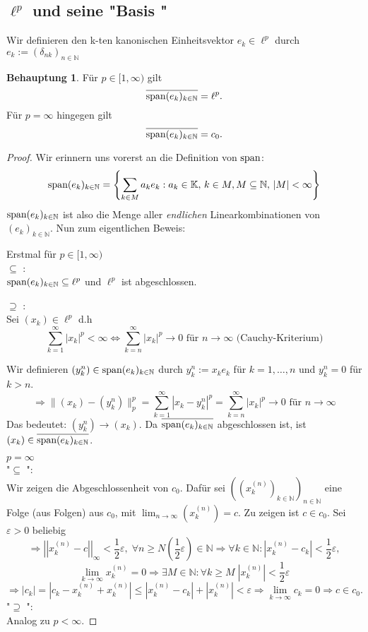 \documentclass[ngerman]{article}
\theoremstyle{definition}%
\newtheorem*{beh}{Behauptung}
\newcommand{\N}{\mathbb{N}}
\newcommand{\K}{\mathbb{K}}
\newcommand{\abs}[1]{\left\lvert #1 \right\rvert }
\newcommand{\norm}[1]{\left\lvert \left\lvert #1 \right\rvert \right\rvert}
\newcommand{\df}{\Rightarrow} %
\newcommand{\limes}[1][\infty]{\lim_{n \to #1}}
\newcommand{\afs}{"{}}
\newcommand{\aufspan}{\textnormal{span}}
\renewcommand{\{ }{\left\lbrace}
\renewcommand{\}}{\right\rbrace}
\begin{document}
\subsection{$\ell^p$ und seine \afs Basis \afs}
Wir definieren den k-ten kanonischen Einheitsvektor $e_k\in\ell^p$ durch $e_k:= (\delta_{nk})_{n\in\N}$
\begin{beh}
Für $p\in[1,\infty)$ gilt $$\overline{\aufspan (e_k)_{k\in\N}} = \ell^p.$$
Für $p= \infty$ hingegen gilt
	$$\overline{\aufspan (e_k)_{k\in\N}} = c_0.$$
\end{beh}
\begin{proof}
Wir erinnern uns vorerst an die Definition von $\aufspan$: 
$$\aufspan (e_k)_{k\in\N} = \left\lbrace\sum_{k\in M} a_k e_k : a_k \in \K,\,k\in M,M \subseteq	 \N ,\, |M| < \infty \right\rbrace$$
$\aufspan (e_k)_{k\in\N}$ ist also die Menge aller \textit{endlichen} Linearkombinationen von $(e_k)_{k\in\N}$.
Nun zum eigentlichen Beweis:\par
Erstmal für $p\in [1,\infty)$\\
\glqq $\subseteq$ \grqq:\\
$\aufspan (e_k)_{k\in\N} \subseteq \ell^p$ und $\ell^p$ ist abgeschlossen. \par

\glqq $\supseteq$ \grqq:\\
Sei $(x_k) \in \ell^p$ d.h $$\sum^\infty_{k=1} |x_k|^p < \infty \Leftrightarrow 
\sum^\infty_{k=n} |x_k|^p \longrightarrow 0 \text{ für } n\longrightarrow\infty \text{ (Cauchy-Kriterium)}$$

Wir definieren $(y^n_k)\in \aufspan (e_k)_{k\in\N}$ durch $\displaystyle y^n_k := x_k e_k$ für $k=1,\dots,n$ und $y^n_k = 0$ für $k>n$.
$$\df \|(x_k)-(y^n_k)\|^p_p = \sum^\infty_{k=1}|x_k-y^n_k|^p = \sum^\infty_{k=n} |x_k|^p\longrightarrow 0 \text{ für } n\longrightarrow \infty$$
Das bedeutet: $(y^n_k) \longrightarrow (x_k)$. Da $\overline{\aufspan (e_k)_{k\in\N}}$ abgeschlossen ist, ist $(x_k) \in \overline{\aufspan (e_k)_{k\in\N}}$.

$p = \infty$\\
\afs $\subseteq$ \afs:\\
Wir zeigen die Abgeschlossenheit von $c_0$. Dafür sei $((x^{(n)}_k)_{k\in\N})_{n\in\N}$ eine Folge (aus Folgen) aus $c_0$, mit $\limes (x^{(n)}_k) = c$. Zu zeigen ist $c\in c_0$. Sei $\varepsilon>0$ beliebig
$$\df \norm{x^{(n)}_k - c}_\infty < \frac{1}{2}\varepsilon,\; \forall n \geq N\left(\frac{1}{2}\varepsilon\right)\in\N 
\df \forall k\in\N : \abs{x^{(n)}_k -c_k}<\frac{1}{2}\varepsilon,$$
	$$\lim_{k\to\infty} x^{(n)}_k = 0 \df \exists M\in\N : \forall k \geq M\; \abs{x^{(n)}_k} < \frac{1}{2}\varepsilon$$
	$$\df \abs{c_k} = \abs{c_k - x^{(n)}_k + x^{(n)}_k} \leq \abs{x^{(n)}_k -c_k} + \abs{x^{(n)}_k} < \varepsilon \df \lim_{k\to\infty} c_k = 0 \df c \in c_0.$$ 
\afs $\supseteq$ \afs:\\
	Analog zu $p <\infty$.
\end{proof}
\end{document}
